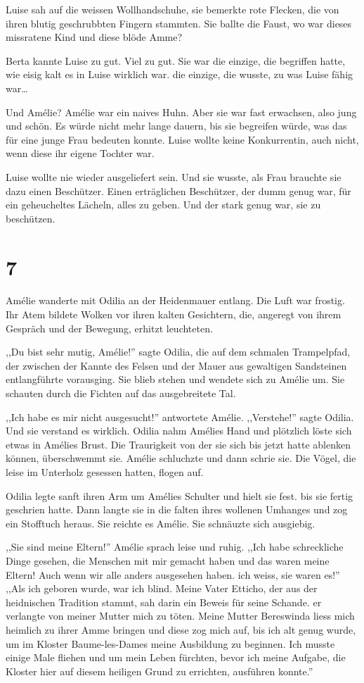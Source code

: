\documentclass[11pt,titlepage,a5paper]{book}
\begin{document}
Luise sah auf die weissen Wollhandschuhe, sie bemerkte rote Flecken, die von ihren blutig geschrubbten Fingern stammten. Sie ballte die Faust, wo war dieses missratene Kind und diese blöde Amme?

Berta kannte Luise zu gut. Viel zu gut. Sie war die einzige, die begriffen hatte, wie eisig kalt es in Luise wirklich war. die einzige, die wusste, zu was Luise fähig war\dots

Und Amélie? Amélie war ein naives Huhn. Aber sie war fast erwachsen, also jung und schön. Es würde nicht mehr lange dauern, bis sie begreifen würde, was das für eine junge Frau bedeuten konnte. Luise wollte keine Konkurrentin, auch nicht, wenn diese ihr eigene Tochter war.

Luise wollte nie wieder ausgeliefert sein. Und sie wusste, als Frau brauchte sie dazu einen Beschützer. Einen erträglichen Beschützer, der dumm genug war, für ein geheucheltes Lächeln, alles zu geben. Und der stark genug war, sie zu beschützen.

\section*{7}

Amélie wanderte mit Odilia an der Heidenmauer entlang. Die Luft war frostig. Ihr Atem bildete Wolken vor ihren kalten Gesichtern, die, angeregt von ihrem Gespräch und der Bewegung, erhitzt leuchteten.

,,Du bist sehr mutig, Amélie!'' sagte Odilia, die auf dem schmalen Trampelpfad, der zwischen der Kannte des Felsen und der Mauer aus gewaltigen Sandsteinen entlangführte vorausging. Sie blieb stehen und wendete sich zu Amélie um. Sie schauten durch die Fichten auf das ausgebreitete Tal.

,,Ich habe es mir nicht ausgesucht!'' antwortete Amélie. ,,Verstehe!'' sagte Odilia. Und sie verstand es wirklich.
Odilia nahm Amélies Hand und plötzlich löste sich etwas in Amélies Brust. Die Traurigkeit von der sie sich bis jetzt hatte ablenken können, überschwemmt sie. Amélie schluchzte und dann schrie sie. Die Vögel, die leise im Unterholz gesessen hatten, flogen auf. 

Odilia legte sanft ihren Arm um Amélies Schulter und hielt sie fest. bis sie fertig geschrien hatte. Dann langte sie in die falten ihres wollenen Umhanges und zog ein Stofftuch heraus. Sie reichte es Amélie. Sie schnäuzte sich ausgiebig.

,,Sie sind meine Eltern!'' Amélie sprach leise und ruhig. ,,Ich habe schreckliche Dinge gesehen, die Menschen mit mir gemacht haben und das waren meine Eltern! Auch wenn wir alle anders ausgesehen haben. ich weiss, sie waren es!'' ,,Als ich geboren wurde, war ich blind. Meine Vater Etticho, der aus der heidnischen Tradition stammt, sah darin ein Beweis für seine Schande. er verlangte von meiner Mutter mich zu töten. Meine Mutter Bereswinda liess mich heimlich zu ihrer Amme bringen und diese zog mich auf, bis ich alt genug wurde, um im Kloster Baume-les-Dames meine Ausbildung zu beginnen. Ich musste einige Male fliehen und um mein Leben fürchten, bevor ich meine Aufgabe, die Kloster hier auf diesem heiligen Grund zu errichten, ausführen konnte.''
\end{document}
